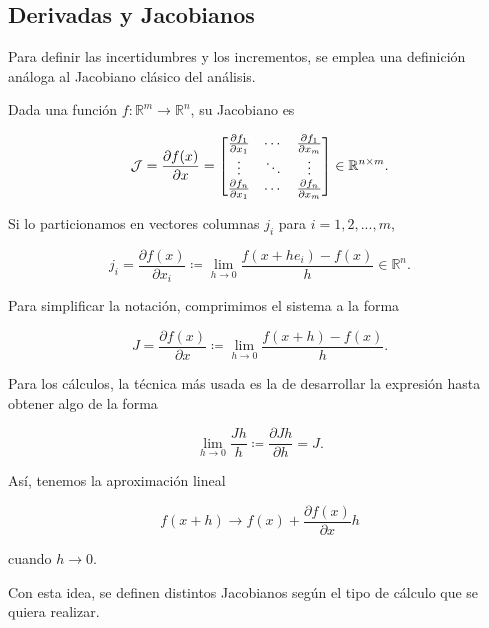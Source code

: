 \subsection{Derivadas y Jacobianos}

Para definir las incertidumbres y los incrementos, se emplea una definición análoga al Jacobiano clásico del análisis. 

Dada una función $f: \mathbb{R}^m \to \mathbb{R}^n$, su Jacobiano es

$$
\mathcal{J}
=
\frac{\partial f(x)}{\partial x}
=
\begin{bmatrix}
\frac{\partial f_1}{\partial x_1} & \cdots & \frac{\partial f_1}{\partial x_m} \\
\vdots & \ddots & \vdots \\
\frac{\partial f_n}{\partial x_1} & \cdots & \frac{\partial f_n}{\partial x_m}
\end{bmatrix}
\in \mathbb{R}^{n \times m}.
$$

Si lo particionamos en vectores columnas $j_i$ para $i = 1,2,...,m$,

$$
j_i = \frac{\partial f(x)}{\partial x_i} \coloneq
\lim_{h \to 0} \frac{f(x+h e_i) - f(x)}{h} \in \mathbb{R}^n.
$$

Para simplificar la notación, comprimimos el sistema a la forma

$$
J = \frac{\partial f(x)}{\partial x} \coloneq
\lim_{h \to 0} \frac{f(x+h) - f(x)}{h}.
$$

Para los cálculos, la técnica más usada es la de desarrollar la expresión hasta obtener algo de la forma

$$
\lim_{h \to 0} \frac{Jh}{h} \coloneq \frac{\partial Jh}{\partial h} = J.
$$

Así, tenemos la aproximación lineal

$$
f(x+h) \longrightarrow f(x) + \frac{\partial f(x)}{\partial x} h
$$

\noindent cuando $h \to 0$.

Con esta idea, se definen distintos Jacobianos según el tipo de cálculo que se quiera realizar. 

